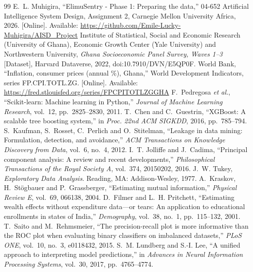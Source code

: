 \documentclass[conference,a4paper]{IEEEtran}
\begin{document}
\clearpage
\renewcommand{\refname}{\textbf{References}}
\begin{thebibliography}{99}
 E.~L. Muhigira, ``ElimuSentry - Phase 1: Preparing the data,'' 04-652 Artificial Intelligence System Design, Assignment 2, Carnegie Mellon University Africa, 2026. [Online]. Available: \url{https://github.com/Emile-Lucky-Muhigira/AISD_Project}
 Institute of Statistical, Social and Economic Research (University of Ghana), Economic Growth Center (Yale University) and Northwestern University, \emph{Ghana Socioeconomic Panel Survey, Waves 1--3} [Dataset], Harvard Dataverse, 2022, doi:10.7910/DVN/E5QP0F.
 World Bank, ``Inflation, consumer prices (annual \%), Ghana,'' World Development Indicators, series FP.CPI.TOTL.ZG. [Online]. Available: \url{https://fred.stlouisfed.org/series/FPCPITOTLZGGHA}
 F.~Pedregosa \emph{et al.}, ``Scikit-learn: Machine learning in Python,'' \emph{Journal of Machine Learning Research}, vol.~12, pp.~2825--2830, 2011.
 T.~Chen and C.~Guestrin, ``XGBoost: A scalable tree boosting system,'' in \emph{Proc. 22nd ACM SIGKDD}, 2016, pp.~785--794.
 S.~Kaufman, S.~Rosset, C.~Perlich and O.~Stitelman, ``Leakage in data mining: Formulation, detection, and avoidance,'' \emph{ACM Transactions on Knowledge Discovery from Data}, vol.~6, no.~4, 2012.
 I.~T. Jolliffe and J.~Cadima, ``Principal component analysis: A review and recent developments,'' \emph{Philosophical Transactions of the Royal Society A}, vol.~374, 20150202, 2016.
 J.~W. Tukey, \emph{Exploratory Data Analysis}. Reading, MA: Addison-Wesley, 1977.
 A.~Kraskov, H.~St\"ogbauer and P.~Grassberger, ``Estimating mutual information,'' \emph{Physical Review E}, vol.~69, 066138, 2004.
 D.~Filmer and L.~H. Pritchett, ``Estimating wealth effects without expenditure data---or tears: An application to educational enrollments in states of India,'' \emph{Demography}, vol.~38, no.~1, pp.~115--132, 2001.
 T.~Saito and M.~Rehmsmeier, ``The precision-recall plot is more informative than the ROC plot when evaluating binary classifiers on imbalanced datasets,'' \emph{PLoS ONE}, vol.~10, no.~3, e0118432, 2015.
 S.~M. Lundberg and S.-I. Lee, ``A unified approach to interpreting model predictions,'' in \emph{Advances in Neural Information Processing Systems}, vol.~30, 2017, pp.~4765--4774.
\end{thebibliography}
\end{document}
